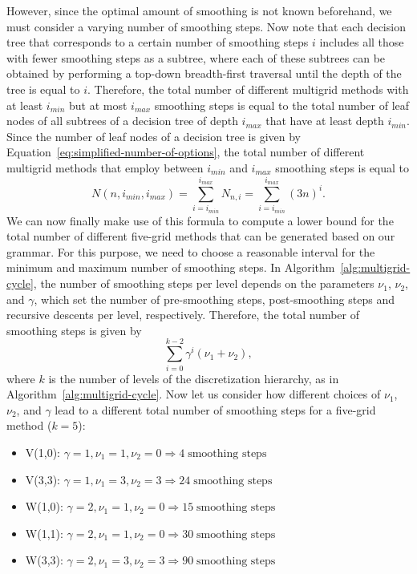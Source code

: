 However, since the optimal amount of smoothing is not known beforehand, we must consider a varying number of smoothing steps.
Now note that each decision tree that corresponds to a certain number of smoothing steps $i$ includes all those with fewer smoothing steps as a subtree, where each of these subtrees can be obtained by performing a top-down breadth-first traversal until the depth of the tree is equal to $i$.
Therefore, the total number of different multigrid methods with at least $i_{min}$ but at most $i_{max}$ smoothing steps is equal to the total number of leaf nodes of all subtrees of a decision tree of depth $i_{max}$ that have at least depth $i_{min}$.
Since the number of leaf nodes of a decision tree is given by Equation~\ref{eq:simplified-number-of-options}, the total number of different multigrid methods that employ between $i_{min}$ and $i_{max}$ smoothing steps is equal to
\begin{equation}\tag{4.10}
	N(n, i_{min}, i_{max}) = \sum_{i = i_{min}}^{i_{max}} N_{n,i} = \sum_{i = i_{min}}^{i_{max}} (3 n)^i.
	\label{eq:search-space-estimation}
\end{equation}
We can now finally make use of this formula to compute a lower bound for the total number of different five-grid methods that can be generated based on our grammar.
For this purpose, we need to choose a reasonable interval for the minimum and maximum number of smoothing steps.
In Algorithm~\ref{alg:multigrid-cycle}, the number of smoothing steps per level depends on the parameters $\nu_1$, $\nu_2$, and $\gamma$, which set the number of pre-smoothing steps, post-smoothing steps and recursive descents per level, respectively.
Therefore, the total number of smoothing steps is given by
\begin{equation}\tag{4.11}
	\sum_{i = 0}^{k - 2} \gamma^i (\nu_1 + \nu_2),
\end{equation}
where $k$ is the number of levels of the discretization hierarchy, as in Algorithm~\ref{alg:multigrid-cycle}.
Now let us consider how different choices of $\nu_1$, $\nu_2$, and $\gamma$ lead to a different total number of smoothing steps for a five-grid method ($k = 5$):
\begin{itemize}
	\item V(1,0): $\gamma = 1, \nu_1 = 1, \nu_2 = 0 \Rightarrow 4 \; \text{smoothing steps}$
	\item V(3,3): $\gamma = 1, \nu_1 = 3, \nu_2 = 3 \Rightarrow 24 \; \text{smoothing steps}$
	\item W(1,0): $\gamma = 2, \nu_1 = 1, \nu_2 = 0 \Rightarrow 15 \; \text{smoothing steps}$
	\item W(1,1): $\gamma = 2, \nu_1 = 1, \nu_2 = 0 \Rightarrow 30 \; \text{smoothing steps}$
	\item W(3,3): $\gamma = 2, \nu_1 = 3, \nu_2 = 3 \Rightarrow 90 \; \text{smoothing steps}$
\end{itemize}
